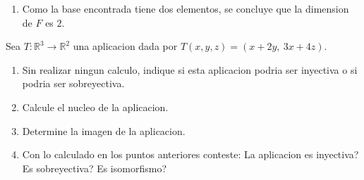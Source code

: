 \documentclass[11pt,respuestas,a4]{aleph-examen}
\begin{document}
\begin{preguntas}
\begin{respuesta}
\begin{enumerate}
\[\begin{pmatrix}
            \end{pmatrix}
            +
            \alpha_2\begin{pmatrix}
                0 & -2\\
                -2 & 1
            \end{pmatrix}
            =
            \begin{pmatrix}
                0 & 0\\
                0 & 0
            \end{pmatrix},
        \]
        al comparar las entradas $(1,1)$ y $(2,2)$ se obtiene $\alpha_1=0$ y $\alpha_2=0$. Por lo tanto, el conjunto es linealmente independiente.
    \item
        Como la base encontrada tiene dos elementos, se concluye que la dimension de $F$ es $2$. \qedhere
    \end{enumerate}
\end{respuesta}

\item
    Sea $T: \mathbb{R}^3 \to \mathbb{R}^2$ una aplicacion dada por $T(x,y,z) = (x+2y,\ 3x+4z)$.
    \begin{enumerate}
    \item
        Sin realizar ningun calculo, indique si esta aplicacion podria ser inyectiva o si podria ser sobreyectiva.
    \item
        Calcule el nucleo de la aplicacion. 
    \item
        Determine la imagen de la aplicacion. 
    \item
        Con lo calculado en los puntos anteriores conteste: La aplicacion es inyectiva? Es sobreyectiva? Es isomorfismo? 
    \end{enumerate}


\end{preguntas}
\end{document}
